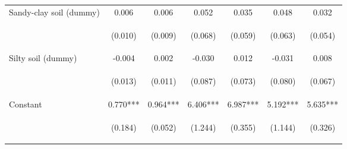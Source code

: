 \begin{center}
\begin{tabular}{lcccccc}
Sandy-clay soil (dummy) & 0.006 & 0.006 & 0.052 & 0.035 & 0.048 & 0.032 \\
\vspace{4pt} & \begin{footnotesize}(0.010)\end{footnotesize} & \begin{footnotesize}(0.009)\end{footnotesize} & \begin{footnotesize}(0.068)\end{footnotesize} & \begin{footnotesize}(0.059)\end{footnotesize} & \begin{footnotesize}(0.063)\end{footnotesize} & \begin{footnotesize}(0.054)\end{footnotesize} \\
Silty soil (dummy) & -0.004 & 0.002 & -0.030 & 0.012 & -0.031 & 0.008 \\
\vspace{4pt} & \begin{footnotesize}(0.013)\end{footnotesize} & \begin{footnotesize}(0.011)\end{footnotesize} & \begin{footnotesize}(0.087)\end{footnotesize} & \begin{footnotesize}(0.073)\end{footnotesize} & \begin{footnotesize}(0.080)\end{footnotesize} & \begin{footnotesize}(0.067)\end{footnotesize} \\
Constant & 0.770*** & 0.964*** & 6.406*** & 6.987*** & 5.192*** & 5.635*** \\
 & \begin{footnotesize}(0.184)\end{footnotesize} & \begin{footnotesize}(0.052)\end{footnotesize} & \begin{footnotesize}(1.244)\end{footnotesize} & \begin{footnotesize}(0.355)\end{footnotesize} & \begin{footnotesize}(1.144)\end{footnotesize} & \begin{footnotesize}(0.326)\end{footnotesize} \\

\end{tabular}
\end{center}
